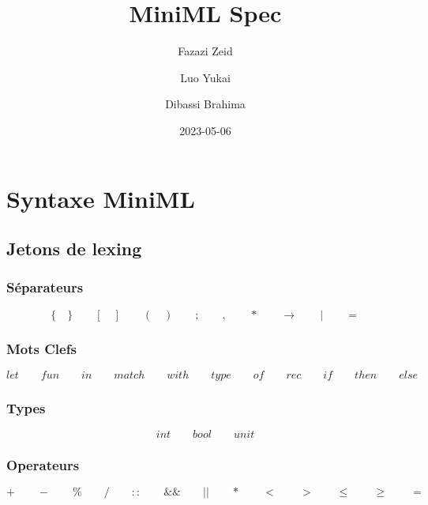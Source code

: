\documentclass[
  12pt,
]{article}
\title{MiniML Spec}
\author{Fazazi Zeid \and Luo Yukai \and Dibassi Brahima}
\date{2023-05-06}
\begin{document}
\maketitle

\newpage

{
  \hypersetup{linkcolor=}
  \setcounter{tocdepth}{3}
  \tableofcontents
}
\allowdisplaybreaks
\pagebreak

\hypertarget{syntaxe-miniml}{%
  \section{Syntaxe MiniML}\label{syntaxe-miniml}}

\hypertarget{jetons-de-lexing}{%
  \subsection{Jetons de lexing}\label{jetons-de-lexing}}

\hypertarget{suxe9parateurs}{%
  \subsubsection{Séparateurs}\label{suxe9parateurs}}

\[\{\quad\}\qquad[\quad]\qquad(\quad)\qquad;\qquad,\qquad*\qquad\rightarrow\qquad|\qquad=\]

\hypertarget{mots-clefs}{%
  \subsubsection{Mots Clefs}\label{mots-clefs}}

\[let \qquad fun\qquad in \qquad match \qquad with \qquad type \qquad of \qquad rec \qquad if \qquad then \qquad else\]

\hypertarget{types}{%
  \subsubsection{Types}\label{types}}

\[int\qquad bool\qquad unit\]

\hypertarget{operateurs}{%
  \subsubsection{Operateurs}\label{operateurs}}

\[ + \qquad - \qquad \% \qquad  /  \qquad :: \qquad  \&\& \qquad  || \qquad  * \qquad < \qquad > \qquad \leq \qquad \geq \qquad = \]
\end{document}
